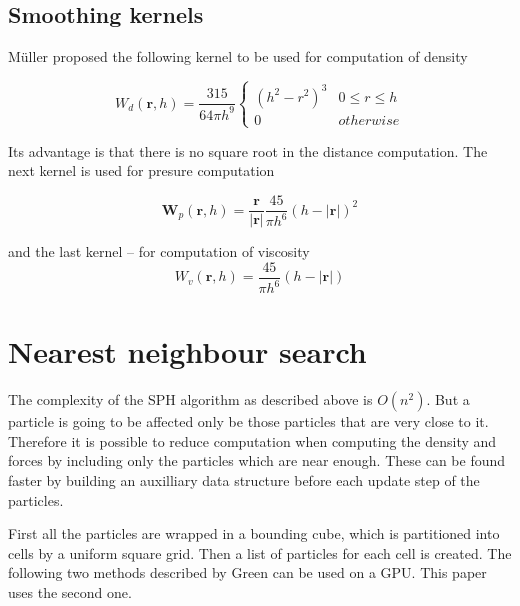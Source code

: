 \documentclass[a4paper,report]{IEEEtran}
\begin{document}
\subsection{Smoothing kernels}
Müller \cite{Articles:Muller} proposed the following kernel to be used for computation of density 

\begin{equation}
	W_d(\mathbf{r},h) = \frac{315}{64\pi h^9}
	\left\{
		\begin{array}{ll}
			(h^2-r^2)^3 	& 0\leq r \leq h\\
			0 						& otherwise
		\end{array}
		\right.
\end{equation}

Its advantage is that there is no square root in the distance computation. The next kernel is used for presure computation

\begin{equation}
	\mathbf{W}_p(\mathbf{r},h) = \frac{\mathbf{r}}{|\mathbf{r}|} \frac{45}{\pi h^6} (h-|\mathbf{r}|)^2
\end{equation}

and the last kernel -- for computation of viscosity
\begin{equation}
	W_v(\mathbf{r},h) = \frac{45}{\pi h^6} (h-|\mathbf{r}|)
\end{equation}

\section{Nearest neighbour search}
The complexity of the SPH algorithm as described above is $O(n^2)$. But a particle is going to be affected only be those particles that are very close to it. Therefore it is possible to reduce computation when computing the density and forces by including only the particles which are near enough. These can be found faster by building an auxilliary data structure before each update step of the particles.

First all the particles are wrapped in a bounding cube, which is partitioned into cells by a uniform square grid. Then a list of particles for each cell is created. The following two methods described by Green \cite{Articles:Green} can be used on a GPU. This paper uses the second one.
\end{document}
